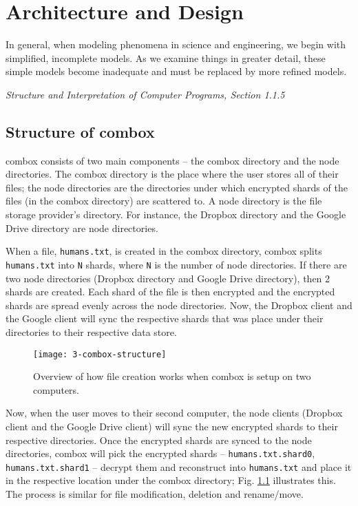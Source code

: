\chapter{Architecture and Design}

\epigraph{In general, when modeling phenomena in science and
  engineering, we begin with simplified, incomplete models. As we
  examine things in greater detail, these simple models become
  inadequate and must be replaced by more refined
  models.}{\textit{Structure and Interpretation of Computer Programs,
    Section 1.1.5} \cite{sicp}}

\section{Structure of combox}

combox consists of two main components -- the combox directory and the
node directories. The combox directory is the place where the user
stores all of their files; the node directories are the directories
under which encrypted shards of the files (in the combox directory)
are scattered to. A node directory is the file storage provider's
directory. For instance, the Dropbox directory and the Google Drive
directory are node directories.

When a file, \verb+humans.txt+, is created in the combox directory,
combox splits \verb+humans.txt+ into \verb+N+ shards, where \verb+N+
is the number of node directories. If there are two node directories
(Dropbox directory and Google Drive directory), then 2 shards are
created. Each shard of the file is then encrypted and the encrypted
shards are spread evenly across the node directories. Now, the Dropbox
client and the Google client will sync the respective shards that was
place under their directories to their respective data store.

\begin{figure}[h]
  \texttt{[image: 3-combox-structure]}
  \caption{Overview of how file creation works when combox is setup on
    two computers.}
  \label{fig:3-combox-structure}
\end{figure}

Now, when the user moves to their second computer, the node clients
(Dropbox client and the Google Drive client) will sync the new
encrypted shards to their respective directories. Once the encrypted
shards are synced to the node directories, combox will pick the
encrypted shards -- \verb+humans.txt.shard0+, \verb+humans.txt.shard1+
-- decrypt them and reconstruct into \verb+humans.txt+ and place it in
the respective location under the combox directory;
Fig. \ref{fig:3-combox-structure} illustrates this. The process is
similar for file modification, deletion and rename/move.

